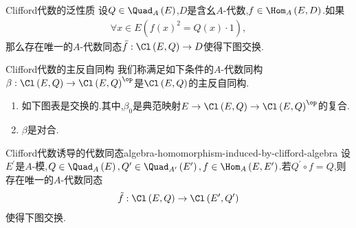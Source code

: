 \begin{proposition}{Clifford代数的泛性质}{}
	设$Q\in\Quad_{A}\left(E\right)$,$D$是含幺$A$-代数,$f\in\Hom_{A}\left(E,D\right)$.如果
	\begin{align*}
		\forall x\in E\left(f\left(x\right)^{2}=Q\left(x\right)\cdot 1\right),
	\end{align*}
	那么存在唯一的$A$-代数同态$\bar{f}:\Cl\left(E,Q\right)\to D$使得下图交换.
	\begin{center}
	\end{center}
\end{proposition}

\begin{definition}{Clifford代数的主反自同构}{}
	我们称满足如下条件的$A$-代数同构$\beta:\Cl\left(E,Q\right)\to\Cl\left(E,Q\right)^{\op}$是$\Cl\left(E,Q\right)$的主反自同构.
	\begin{enumerate}
		\item 如下图表是交换的.其中,$\beta_{0}$是典范映射$E\to\Cl\left(E,Q\right)\to\Cl\left(E,Q\right)^{\op}$的复合.
		\begin{center}
		\end{center}
		\item $\beta$是对合.
	\end{enumerate}
\end{definition}

\begin{proposition}{Clifford代数诱导的代数同态}{algebra-homomorphism-induced-by-clifford-algebra}
	设$E^{\prime}$是$A$-模,$Q\in\Quad_{A}\left(E\right),Q^{\prime}\in\Quad_{A^{\prime}}\left(E^{\prime}\right),f\in\Hom_{A}\left(E,E^{\prime}\right)$.若$Q^{\prime}\circ f=Q$,则存在唯一的$A$-代数同态
	\begin{align*}
		\tilde{f}:\Cl\left(E,Q\right)\to\Cl\left(E^{\prime},Q^{\prime}\right)
	\end{align*}
	使得下图交换.
	\begin{center}
	\end{center}
\end{proposition}

